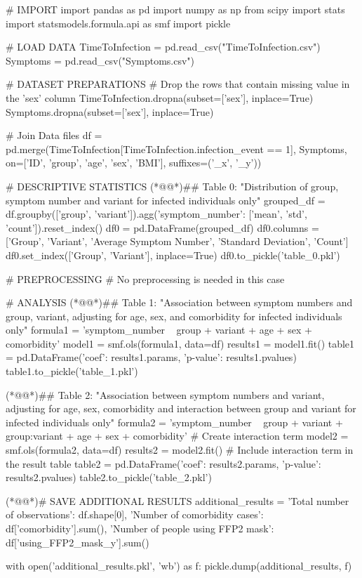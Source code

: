 \documentclass[11pt]{article}
\begin{document}
\begin{python}


# IMPORT
import pandas as pd
import numpy as np
from scipy import stats
import statsmodels.formula.api as smf
import pickle

# LOAD DATA
TimeToInfection = pd.read_csv("TimeToInfection.csv")
Symptoms = pd.read_csv("Symptoms.csv")

# DATASET PREPARATIONS
# Drop the rows that contain missing value in the 'sex' column
TimeToInfection.dropna(subset=['sex'], inplace=True)
Symptoms.dropna(subset=['sex'], inplace=True)

# Join Data files
df = pd.merge(TimeToInfection[TimeToInfection.infection_event == 1], Symptoms, on=['ID', 'group', 'age', 'sex', 'BMI'], suffixes=('_x', '_y'))

# DESCRIPTIVE STATISTICS
(*@@*)## Table 0: "Distribution of group, symptom number and variant for infected individuals only"
grouped_df = df.groupby(['group', 'variant']).agg({'symptom_number': ['mean', 'std', 'count']}).reset_index()
df0 = pd.DataFrame(grouped_df)
df0.columns = ['Group', 'Variant', 'Average Symptom Number', 'Standard Deviation', 'Count']
df0.set_index(['Group', 'Variant'], inplace=True)
df0.to_pickle('table_0.pkl')

# PREPROCESSING
# No preprocessing is needed in this case

# ANALYSIS
(*@@*)## Table 1: "Association between symptom numbers and group, variant, adjusting for age, sex, and comorbidity for infected individuals only"
formula1 = 'symptom_number ~ group + variant + age + sex + comorbidity'
model1 = smf.ols(formula1, data=df)
results1 = model1.fit()
table1 = pd.DataFrame({'coef': results1.params, 'p-value': results1.pvalues})
table1.to_pickle('table_1.pkl')

(*@@*)## Table 2: "Association between symptom numbers and variant, adjusting for age, sex, comorbidity and interaction between group and variant for infected individuals only"
formula2 = 'symptom_number ~ group + variant + group:variant + age + sex + comorbidity' # Create interaction term
model2 = smf.ols(formula2, data=df)
results2 = model2.fit()
# Include interaction term in the result table
table2 = pd.DataFrame({'coef': results2.params, 'p-value': results2.pvalues})
table2.to_pickle('table_2.pkl')

(*@@*)# SAVE ADDITIONAL RESULTS
additional_results = {
    'Total number of observations': df.shape[0],
    'Number of comorbidity cases': df['comorbidity'].sum(),
    'Number of people using FFP2 mask': df['using_FFP2_mask_y'].sum()
}

with open('additional_results.pkl', 'wb') as f:
    pickle.dump(additional_results, f)


\end{python}
\end{document}
